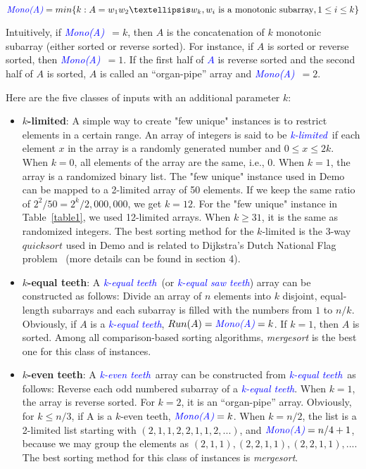 \documentclass[AMA,STIX1COL]{WileyNJD-v2}
\newcommand{\klit}{\textcolor{blue}{\emph{k-limited}}}
\newcommand{\keq}{\textcolor{blue}{\emph{k-equal teeth}}}
\newcommand{\kev}{\textcolor{blue}{\emph{k-even teeth}}}
\newcommand {\mono}{\emph{\textcolor{blue}{Mono(A)}}}
\newcommand{\msort}{\emph{mergesort }}
\newcommand{\msortn}{\emph{mergesort}}
\begin{document}
\[ \mono = min\{ k : A =  w_1 w_2 … w_k, w_i  \text { is a monotonic subarray},1 \leq i \le k\} \]
           
Intuitively, if \mono\ $= k$, then $A$ is the concatenation of $k$ monotonic subarray (either sorted or reverse sorted). 
For instance, if $A$ is sorted or reverse sorted, then \mono\ $ = 1$. 
If the first half of \textcolor{blue}{$A$} is reverse sorted and the second half of $A$ is sorted, $A$ is called an “organ-pipe” array and \mono\ $ = 2$.  

Here are the five classes of inputs with an additional parameter $k$:

\begin{itemize}
\item \textbf{$k$-limited}: A simple way to create "few unique" instances is to restrict elements in a certain range. 
An array of integers is said to be \klit \ if each element $x$ in the array is a randomly generated number and $0 \leq x \leq 2k$. 
When $k = 0$, all elements of the array are the same, i.e., 0. 
When $k = 1$, the array is a randomized binary list. 
The "few unique" instance used in Demo can be mapped to a 2-limited array of 50 elements.  
If we keep the same ratio of $2^2/50 = 2^k/2,000,000$, we get $k = 12$.  
For the "few unique" instance in Table~\ref{table1}, we used 12-limited arrays.  
When $k \ge 31$, it is the same as randomized integers. 
The best sorting method for the $k$-limited is the $3$-way $quicksort$ used in Demo and is related to Dijkstra’s Dutch National Flag problem~\cite{kim2009improving} (more details can be found in section 4).

\item \textbf{$k$-equal teeth}: 
A \keq \ (or \textcolor{blue}{\emph{k-equal saw teeth}}) array can be constructed as follows: Divide an array of $n$ elements into $k$ disjoint, equal-length subarrays and each subarray is filled with the numbers from $1$ to $n/k$. Obviously, if $A$ is a \keq, $Run(A) = \mono = k$. If $k = 1$, then $A$ is sorted. 
Among all comparison-based sorting algorithms, \msort is the best one for this class of instances.

\item \textbf{$k$-even teeth}:  A \kev \ array can be constructed from \keq \ as follows: 
Reverse each odd numbered subarray of a \keq. 
When $k = 1$, the array is reverse sorted. 
For $k = 2$, it is an ``organ-pipe” array.  
Obviously, for $k \leq n/3$, if A is a $k$-even teeth, $\mono = k$. 
When $k = n/2$, the list is a 2-limited list starting with $(2,1,1,2,2,1,1,2, ...)$, and $\mono =  n/4+1$, because we may group the elements as $(2,1,1), (2,2,1,1), (2,2,1,1), ...$. 
The best sorting method for this class of instances is \msortn.


\end{itemize}
\end{document}
